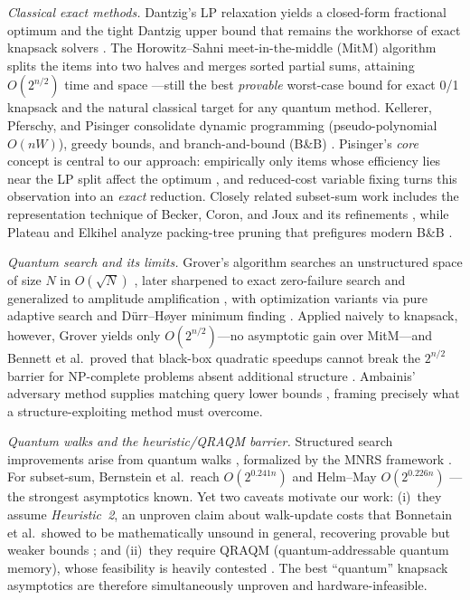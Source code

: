 \documentclass[conference]{IEEEtran}
\begin{document}
\textit{Classical exact methods.} Dantzig's LP relaxation yields a closed-form fractional optimum and the tight Dantzig upper bound that remains the workhorse of exact knapsack solvers \cite{ref1}. The Horowitz--Sahni meet-in-the-middle (MitM) algorithm splits the items into two halves and merges sorted partial sums, attaining $O(2^{n/2})$ time and space \cite{ref2}---still the best \emph{provable} worst-case bound for exact 0/1 knapsack and the natural classical target for any quantum method. Kellerer, Pferschy, and Pisinger consolidate dynamic programming (pseudo-polynomial $O(nW)$), greedy bounds, and branch-and-bound (B\&B) \cite{ref3}. Pisinger's \emph{core} concept is central to our approach: empirically only items whose efficiency lies near the LP split affect the optimum \cite{ref4}, and reduced-cost variable fixing turns this observation into an \emph{exact} reduction. Closely related subset-sum work includes the representation technique of Becker, Coron, and Joux \cite{ref5} and its refinements \cite{ref6}, while Plateau and Elkihel analyze packing-tree pruning that prefigures modern B\&B \cite{ref7}.

\textit{Quantum search and its limits.} Grover's algorithm searches an unstructured space of size $N$ in $O(\sqrt{N})$ \cite{ref8}, later sharpened to exact zero-failure search \cite{ref10} and generalized to amplitude amplification \cite{ref11}, with optimization variants via pure adaptive search \cite{ref12} and D\"urr--H{\o}yer minimum finding \cite{ref13}. Applied naively to knapsack, however, Grover yields only $O(2^{n/2})$---no asymptotic gain over MitM---and Bennett et al.\ proved that black-box quadratic speedups cannot break the $2^{n/2}$ barrier for NP-complete problems absent additional structure \cite{ref9}. Ambainis' adversary method supplies matching query lower bounds \cite{ref34}, framing precisely what a structure-exploiting method must overcome.

\textit{Quantum walks and the heuristic/QRAQM barrier.} Structured search improvements arise from quantum walks \cite{ref14}, formalized by the MNRS framework \cite{ref15}. For subset-sum, Bernstein et al.\ reach $O(2^{0.241n})$ \cite{ref16} and Helm--May $O(2^{0.226n})$ \cite{ref17}---the strongest asymptotics known. Yet two caveats motivate our work: (i)~they assume \emph{Heuristic~2}, an unproven claim about walk-update costs that Bonnetain et al.\ showed to be mathematically unsound in general, recovering provable but weaker bounds \cite{bonnetain2020improved}; and (ii)~they require QRAQM (quantum-addressable quantum memory), whose feasibility is heavily contested \cite{ref18,ref19}. The best ``quantum'' knapsack asymptotics are therefore simultaneously unproven and hardware-infeasible.
\end{document}
